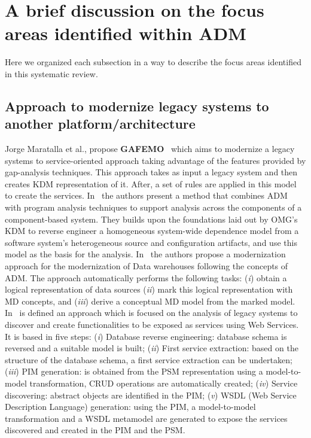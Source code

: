 \section{A brief discussion on the focus areas identified within ADM}

Here we organized each subsection in a way to describe the focus areas identified in this systematic review.

\subsection{Approach to modernize legacy systems to another platform/architecture} %
\label{ssub:approach}

 Jorge Maratalla et al., propose \textbf{GAFEMO}~\cite{6311013} which aims to modernize a legacy systems to service-oriented approach taking advantage of the features provided by gap-analysis techniques. This approach takes as input a legacy system and then creates KDM representation of it. After, a set of rules are applied in this model to create the services. In~\cite{6080786} the authors present a method that combines ADM with program analysis techniques to support analysis across the components of a component-based system. They builds upon the foundations laid out by OMG's KDM to reverse engineer a homogeneous system-wide dependence model from a software system's heterogeneous source and configuration artifacts, and use this model as the basis for the analysis. In~\cite{Mazon:2007:MDM:1784489.1784497} the authors propose a modernization approach for the modernization of Data warehouses following the concepts of ADM. The approach automatically performs the following tasks: (\textit{i}) obtain a logical representation of data sources (\textit{ii}) mark this logical representation with MD concepts, and (\textit{iii}) derive a conceptual MD model from the marked model. In~\cite{Guzman:2007:AAR:1339262.1339532} is defined an approach which is focused on the analysis of legacy systems to discover and create functionalities to be exposed as services using Web Services. It is based in five steps: (\textit{i}) Database reverse engineering: database schema is reversed and a suitable model is built; (\textit{ii}) First service extraction: based on the structure of the database schema, a first service extraction can be undertaken; (\textit{iii}) PIM generation: is obtained from the PSM representation using a model-to-model transformation, CRUD operations are automatically created; (\textit{iv}) Service discovering: abstract objects are identified in the PIM; (\textit{v}) WSDL (Web Service Description Language) generation: using the PIM, a model-to-model transformation and a WSDL  metamodel are generated to expose the services discovered and created in the PIM and the PSM. 

